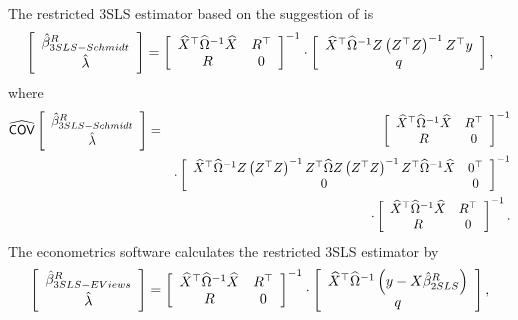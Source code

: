 The restricted 3SLS estimator based on the suggestion of
\cite{schmidt90} is
\begin{equation}
   \left[ \begin{array}{c}
      \hat{\beta}^R_{3SLS-Schmidt} \\[0.2em] \hat{\lambda}
   \end{array} \right]
   =
   \left[ \begin{array}{cc}
      \widehat{X}^\top \widehat{\Omega}^{-1} \widehat{X} & R^\top \\
      R & 0
   \end{array} \right]^{-1}
   \cdot
   \left[ \begin{array}{c}
      \widehat{X}^\top \widehat{\Omega}^{-1} Z \left( Z^\top Z \right)^{-1} Z^\top y \\ q
   \end{array} \right] ,
   \label{eq:3slsSchmidtR}
\end{equation}
where
\begin{eqnarray}
   \widehat{\mathsf{COV}}
   \left[ \begin{array}{c}
      \hat{\beta}^R_{3SLS-Schmidt} \\[0.2em] \hat{\lambda}
   \end{array} \right] 
   & = & 
   \left[ \begin{array}{cc}
      \widehat{X}^\top \widehat{\Omega}^{-1} \widehat{X} & R^\top \\
      R & 0
   \end{array} \right]^{-1}
   \\
   & & \cdot
   \left[ \begin{array}{cc}
      \widehat{X}^\top \widehat{\Omega}^{-1} Z \left( Z^\top Z \right)^{-1} Z^\top \widehat{\Omega}
      Z \left( Z^\top Z \right)^{-1} Z^\top \widehat{\Omega}^{-1} \widehat{X} & 0^\top \\
      0 & 0
   \end{array} \right]^{-1}
   \nonumber \\
   & & \cdot
   \left[ \begin{array}{cc}
      \widehat{X}^\top \widehat{\Omega}^{-1} \widehat{X} & R^\top \\
      R & 0
   \end{array} \right]^{-1} .
   \nonumber
\end{eqnarray}
The econometrics software  calculates the restricted 3SLS estimator by
\begin{equation}
   \left[ \begin{array}{c}
      \hat{\beta}^R_{3SLS-EViews} \\[0.2em] \hat{\lambda}
   \end{array} \right]
   =
   \left[ \begin{array}{cc}
      \widehat{X}^\top \widehat{\Omega}^{-1} \widehat{X} & R^\top \\
      R & 0
   \end{array} \right]^{-1}
   \cdot
   \left[ \begin{array}{c}
      \widehat{X}^\top \widehat{\Omega}^{-1} \left( y - X \hat{\beta}^R_{2SLS} \right)
      \\ q 
   \end{array} \right] ,
   \label{eq:3slsEViewsR}
\end{equation}
